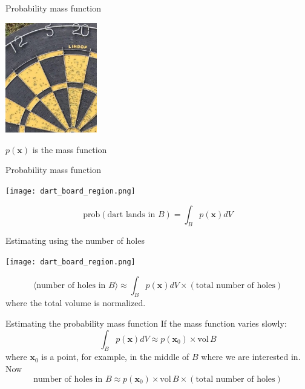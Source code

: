 \documentclass{beamer}
\begin{document}
\begin{frame}{Probability mass function}
\color{reddish}
\begin{center}
\includegraphics[width=4cm]{dart_board_zoom.png}
\end{center}
\begin{center}
\color{black}
$p(\mathbf{x})$ is the mass function
\end{center}
\color{black}
\end{frame}


\begin{frame}{Probability mass function}
\begin{center}
\texttt{[image: dart\_board\_region.png]}
\end{center}
\color{dark}
$$\mbox{prob}(\mbox{dart lands in }B)=\int_B p(\mathbf{x})dV$$
\color{black}
\end{frame}


\begin{frame}{Estimating using the number of holes}
\color{reddish}
\begin{center}
\texttt{[image: dart\_board\_region.png]}
\end{center}
\color{dark}
$$\langle \mbox{number of holes in }B\rangle \approx \int_B p(\mathbf{x})dV \times (\mbox{total number of holes})$$
\color{black}
where the total volume is normalized.
\end{frame}

\begin{frame}{Estimating the probability mass function}
\color{black}
If the mass function varies slowly:
\color{dark}
$$\int_B p(\mathbf{x})dV\approx p(\mathbf{x}_0) \times \mbox{vol}\,B$$
\color{black}
where $\textbf{x}_0$ is a point, for example, in the middle of $B$ where we are interested in. Now
\color{dark}
$$\mbox{number of holes in }B \approx p(\mathbf{x}_0) \times \mbox{vol}\,B \times (\mbox{total number of holes})$$
\color{black}
\end{frame}
\end{document}
